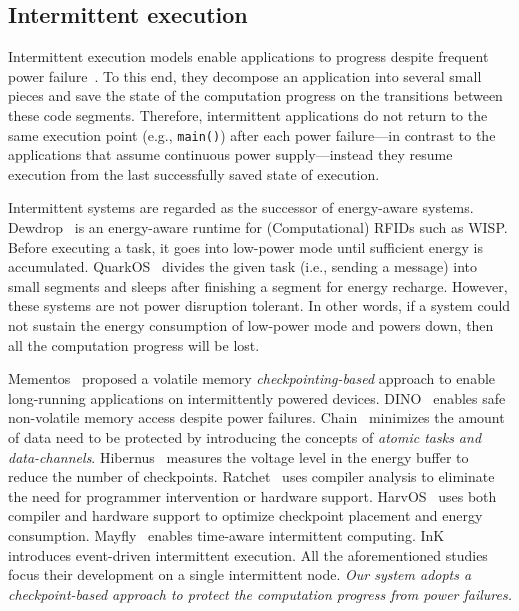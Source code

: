 \subsection{Intermittent execution}
Intermittent execution models enable applications to progress despite frequent power failure~\cite{van2016intermittent,colin2016chain,lucia2015simpler,bhatti2017harvos,gobieski2019intelligence}. To this end, they decompose an application into several small pieces and save the state of the computation progress on the transitions between these code segments. Therefore, intermittent applications do not return to the same execution point (e.g., \texttt{main()}) after each power failure---in contrast to the applications that assume continuous power supply---instead they resume execution from the last successfully saved state of execution.   

Intermittent systems are regarded as the successor of energy-aware systems. Dewdrop~\cite{buettner2011dewdrop} is an energy-aware runtime for (Computational) RFIDs such as WISP. Before executing a task, it goes into low-power mode until sufficient energy is accumulated. QuarkOS~\cite{zhang2013quarkos} divides the given task (i.e., sending a message) into small segments and sleeps after finishing a segment for energy recharge. However, these systems are not power disruption tolerant. In other words, if a system could not sustain the energy consumption of low-power mode and powers down, then all the computation progress will be lost. 

Mementos~\cite{ransford2011mementos} proposed a volatile memory \emph{checkpointing-based} approach to enable long-running applications on intermittently powered devices. DINO~\cite{dino} enables safe non-volatile memory access despite power failures. Chain~\cite{colin2016chain} minimizes the amount of data need to be protected by introducing the concepts of \emph{atomic tasks and data-channels}. Hibernus~\cite{balsamo2014hibernus,balsamo2016hibernus++} measures the voltage level in the energy buffer to reduce the number of checkpoints. Ratchet~\cite{woude2016ratchet} uses compiler analysis to eliminate the need for programmer intervention or hardware support. HarvOS~\cite{bhatti2017harvos} uses both compiler and hardware support to optimize checkpoint placement and energy consumption. Mayfly~\cite{hester2017timely} enables time-aware intermittent computing. InK~\cite{yildirim2018ink} introduces event-driven intermittent execution. All the aforementioned studies focus their development on a single intermittent node. 
\emph{Our system adopts a checkpoint-based approach to protect the computation progress from power failures.}


